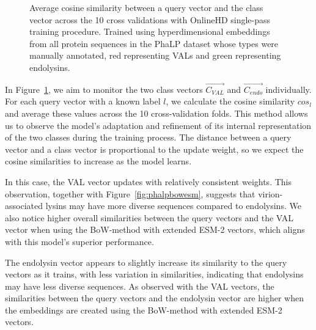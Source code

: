 \begin{figure}[htbp]
    \caption{Average cosine similarity between a query vector and the class vector across the 10 cross validations with OnlineHD single-pass training procedure. Trained using hyperdimensional embeddings from all protein sequences in the PhaLP dataset whose types were manually annotated, red representing VALs and green representing endolysins.}
    \label{fig:main}
\end{figure}

In Figure~\ref{fig:main}, we aim to monitor the two class vectors $\vec{C_{VAL}}$ and $\vec{C_{endo}}$ individually. For each query vector with a known label $l$, we calculate the cosine similarity $cos_{l}$ and average these values across the 10 cross-validation folds. This method allows us to observe the model's adaptation and refinement of its internal representation of the two classes during the training process. The distance between a query vector and a class vector is proportional to the update weight, so we expect the cosine similarities to increase as the model learns.

In this case, the VAL vector updates with relatively consistent weights. This observation, together with Figure~\ref{fig:phalpbowesm}, suggests that virion-associated lysins may have more diverse sequences compared to endolysins. We also notice higher overall similarities between the query vectors and the VAL vector when using the BoW-method with extended ESM-2 vectors, which aligns with this model's superior performance.

The endolysin vector appears to slightly increase its similarity to the query vectors as it trains, with less variation in similarities, indicating that endolysins may have less diverse sequences. As observed with the VAL vectors, the similarities between the query vectors and the endolysin vector are higher when the embeddings are created using the BoW-method with extended ESM-2 vectors.